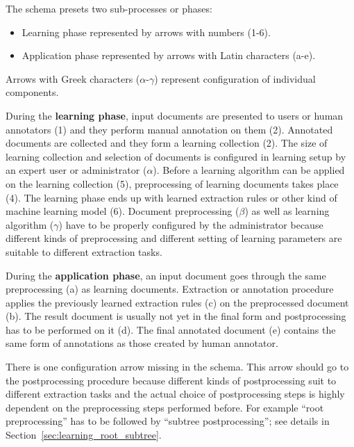 The schema presets two sub-processes or phases:

\begin{itemize}
	\item Learning phase represented by arrows with numbers (1-6).
	\item Application phase represented by arrows with Latin characters (a-e).
\end{itemize}

Arrows with Greek characters ($\alpha$-$\gamma$) represent configuration of individual components.

\medskip

During the \textbf{learning phase}, input documents are presented to users or human annotators (1) and they perform manual annotation on them (2). Annotated documents are collected and they form a learning collection (2). The size of learning collection and selection of documents is configured in learning setup by an expert user or administrator ($\alpha$). Before a learning algorithm can be applied on the learning collection (5), preprocessing of learning documents takes place (4). The learning phase ends up with learned extraction rules or other kind of machine learning model (6). Document preprocessing ($\beta$) as well as learning algorithm ($\gamma$) have to be properly configured by the administrator because different kinds of preprocessing and different setting of learning parameters are suitable to different extraction tasks.

During the \textbf{application phase}, an input document goes through the same preprocessing (a) as learning documents. Extraction or annotation procedure applies the previously learned extraction rules (c) on the preprocessed document (b). The result document is usually not yet in the final form and postprocessing has to be performed on it (d). The final annotated document (e) contains the same form of annotations as those created by human annotator.


There is one configuration arrow missing in the schema. This arrow should go to the postprocessing procedure because different kinds of postprocessing suit to different extraction tasks and the actual choice of postprocessing steps is highly dependent on the preprocessing steps performed before. For example ``root preprocessing'' has to be followed by ``subtree postprocessing''; see details in Section~\ref{sec:learning_root_subtree}.



